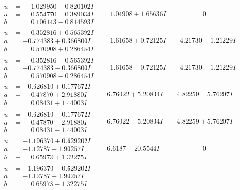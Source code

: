 \documentclass[1p]{elsarticle_modified}
\theoremstyle{definition}
\begin{document}
$$\begin{array}{c|c|c}
\begin{aligned}
u &= \phantom{-}1.029950 - 0.820102 I \\
a &= \phantom{-}0.554770 - 0.389034 I \\
b &= \phantom{-}0.106143 - 0.814593 I\end{aligned}
 & \phantom{-}1.04908 + 1.65636 I & \phantom{-0.000000 } 0 \\ \hline\begin{aligned}
u &= \phantom{-}0.352816 + 0.565392 I \\
a &= -0.774383 + 0.366800 I \\
b &= \phantom{-}0.570908 + 0.286454 I\end{aligned}
 & \phantom{-}1.61658 + 0.72125 I & \phantom{-}4.21730 + 1.21229 I \\ \hline\begin{aligned}
u &= \phantom{-}0.352816 - 0.565392 I \\
a &= -0.774383 - 0.366800 I \\
b &= \phantom{-}0.570908 - 0.286454 I\end{aligned}
 & \phantom{-}1.61658 - 0.72125 I & \phantom{-}4.21730 - 1.21229 I \\ \hline\begin{aligned}
u &= -0.626810 + 0.177672 I \\
a &= \phantom{-}0.47870 + 2.91880 I \\
b &= \phantom{-}0.08431 + 1.44003 I\end{aligned}
 & -6.76022 + 5.20834 I & -4.82259 - 5.76207 I \\ \hline\begin{aligned}
u &= -0.626810 - 0.177672 I \\
a &= \phantom{-}0.47870 - 2.91880 I \\
b &= \phantom{-}0.08431 - 1.44003 I\end{aligned}
 & -6.76022 - 5.20834 I & -4.82259 + 5.76207 I \\ \hline\begin{aligned}
u &= -1.196370 + 0.629202 I \\
a &= -1.12787 + 1.90257 I \\
b &= \phantom{-}0.65973 + 1.32275 I\end{aligned}
 & -6.6187 + 20.5544 I & \phantom{-0.000000 } 0 \\ \hline\begin{aligned}
u &= -1.196370 - 0.629202 I \\
a &= -1.12787 - 1.90257 I \\
b &= \phantom{-}0.65973 - 1.32275 I\end{aligned}

\end{array}$$
\end{document}
